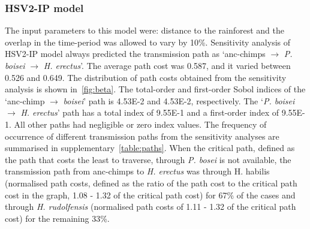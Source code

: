 \documentclass[fleqn,10pt]{wlscirep}
\begin{document}
\subsubsection*{HSV2-IP model}
The input parameters to this model were: distance to the rainforest and the overlap in the time-period was allowed to vary by 10\%. Sensitivity analysis of HSV2-IP model always predicted the transmission path as `anc-chimps $\rightarrow$ \textit{P. boisei} $\rightarrow$ \textit{H. erectus}'.  The average path cost was 0.587, and it varied between 0.526 and 0.649. The distribution of path costs obtained from the sensitivity analysis is shown in~\cref{fig:beta}.  The total-order and first-order Sobol indices of the `anc-chimp $\rightarrow$ \textit{boisei}’ path is 4.53E-2 and 4.53E-2, respectively. The `\textit{P. boisei} $\rightarrow$ \textit{H. erectus}' path has a total index of 9.55E-1 and a first-order index of 9.55E-1. All other paths had negligible or zero index values. The frequency of occurrence of different transmission paths from the sensitivity analyses are summarised in supplementary~\cref{table:paths}. When the critical path, defined as the path that costs the least to traverse, through \textit{P. bosei} is not available, the transmission path from anc-chimps to \textit{H. erectus} was through H. habilis (normalised path costs, defined as the ratio of the path cost to the critical path cost in the graph, 1.08 - 1.32 of the critical path cost) for 67\% of the cases and through \textit{H. rudolfensis} (normalised path costs of 1.11 - 1.32 of the critical path cost) for the remaining 33\%.
\end{document}
